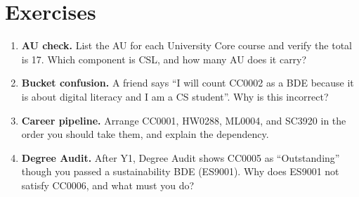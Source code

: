 \section{Exercises}
\label{sec:ch05-exercises}
\begin{enumerate}[label=E5.\arabic*, leftmargin=*, itemsep=0.8em]
    \item \textbf{AU check.} List the AU for each University Core course and verify the total is 17. Which component is CSL, and how many AU does it carry?
    \item \textbf{Bucket confusion.} A friend says ``I will count CC0002 as a BDE because it is about digital literacy and I am a CS student''. Why is this incorrect?
    \item \textbf{Career pipeline.} Arrange CC0001, HW0288, ML0004, and SC3920 in the order you should take them, and explain the dependency.
    \item \textbf{Degree Audit.} After Y1, Degree Audit shows CC0005 as ``Outstanding'' though you passed a sustainability BDE (ES9001). Why does ES9001 not satisfy CC0006, and what must you do?
\end{enumerate}
